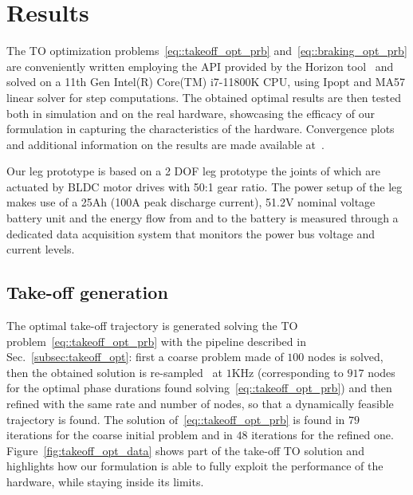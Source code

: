 \section{Results}\label{sec:exp_results}
The TO optimization problems~\eqref{eq::takeoff_opt_prb} and~\eqref{eq::braking_opt_prb} are conveniently written employing the API provided by the Horizon tool~\cite{to::horizon_to} and solved on a 11th Gen Intel(R) Core(TM) i7-11800K CPU, using Ipopt and MA57 linear solver for  step computations. 
The obtained optimal results are then tested both in simulation and on the real hardware, showcasing the efficacy of our formulation in capturing the characteristics of the hardware. Convergence plots and additional information on the results are made available at~\cite{url::data_link}.

Our leg prototype is based on a 2 DOF
leg prototype the joints of which are actuated by BLDC motor drives with 50:1 gear ratio. The power setup of the
leg makes use of a 25Ah (100A peak discharge current), 51.2V nominal voltage battery unit and the energy flow from and to the battery is measured through a dedicated data acquisition system that monitors the power bus voltage and current levels.
\subsection{Take-off generation}
The optimal take-off trajectory is generated solving the TO problem~\eqref{eq::takeoff_opt_prb} with the pipeline described in Sec.~\ref{subsec:takeoff_opt}: first a coarse problem made of $100$ nodes is solved, then the obtained solution is re-sampled~\cite{to::horizon_to} at  $1\mathrm{KHz}$ (corresponding to $917$ nodes for the optimal phase durations found solving~\eqref{eq::takeoff_opt_prb}) and then refined with the same rate and number of nodes, so that a dynamically feasible trajectory is found. The solution of~\eqref{eq::takeoff_opt_prb} is found in $79$ iterations for the coarse initial problem and in $48$ iterations for the refined one. 
Figure~\ref{fig:takeoff_opt_data} shows part of the take-off TO solution and highlights how our formulation is able to fully exploit the performance of the hardware, while staying inside its limits. 
